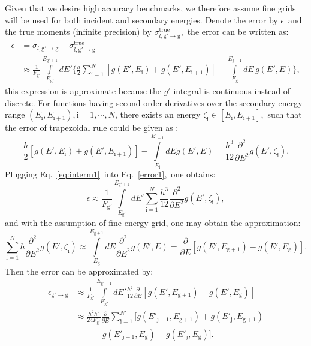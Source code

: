\documentclass[review]{elsarticle}
\newcommand{\fgp}{F_\mathrm{g'}}
\newcommand{\sgg}{\sigma_{l,\mathrm{g'}\to \mathrm{g}}}
\newcommand{\eg}{E_\mathrm{g}}
\newcommand{\egp}{E_\mathrm{g'}}
\newcommand{\ego}{E_\mathrm{g+1}}
\newcommand{\egpo}{E_\mathrm{g'+1}}
\begin{document}
Given that we desire high accuracy benchmarks, we therefore assume fine grids will be used for both incident and secondary energies. Denote the error by $\epsilon$~and the true moments (infinite precision) by $\sigma^{\mathrm{true}}_{l,\mathrm{g'}\to \mathrm{g}}$,~the error can be written as:
\begin{align}\label{error1}
\epsilon&=\sgg-\sigma^{\mathrm{true}}_{l,\mathrm{g'}\to \mathrm{g}}\nonumber\\
&\approx\frac{1}{\fgp}\int\limits_{\egp}^{\egpo}dE'\Bigg\{\frac{h}{2}\sum\limits_{\mathrm{i=}1}^N\left[g(E',E_\mathrm{i})+g(E',E_\mathrm{i+1})\right]-\int\limits_{\eg}^{\ego}dE\,g(E',E)\Bigg\},%
\end{align}
this expression is approximate because the $g'$ integral is continuous instead of discrete.
For functions having second-order derivatives over the secondary energy range $(E_\mathrm{i},E_\mathrm{i+1}),\mathrm{i}=1,\cdots,N$, there exists an energy $\zeta_\mathrm{i}\in[E_\mathrm{i},E_\mathrm{i+1}]$,~such that the error of trapezoidal rule could be given as \cite{numana1}:
\begin{equation}\label{eq:interm1}
\frac{h}{2}\left[g(E',E_\mathrm{i})+g(E',E_\mathrm{i+1})\right]-\int\limits_{E_\mathrm{i}}^{E_\mathrm{i+1}}dEg(E',E)=\frac{h^3}{12}\frac{\partial^2}{\partial E^2}g(E',\zeta_\mathrm{i}).
\end{equation}
Plugging Eq.~\eqref{eq:interm1}~into Eq.~\eqref{error1},~one obtains:
\begin{equation}
\epsilon\approx\frac{1}{\fgp}\int\limits_{\egp}^{\egpo}dE'\sum\limits_{\mathrm{i=}1}^{N}\frac{h^3}{12}\frac{\partial^2}{\partial E^2}g(E',\zeta_\mathrm{i}),
\end{equation}
and with the assumption of fine energy grid, one may obtain the approximation:
\begin{equation}
\sum\limits_{\mathrm{i=1}}^{N}h\frac{\partial^2}{\partial E^2}g(E',\zeta_\mathrm{i})\approx\int\limits_{E_\mathrm{g}}^{E_\mathrm{g+1}}dE\frac{\partial^2}{\partial E^2}g(E',E)=\frac{\partial}{\partial E}\left[g(E',\ego)-g(E',\eg)\right].
\end{equation}
Then the error can be approximated by:
\begin{align}\label{errorfinal}
\epsilon_{\mathrm{g'}\to\mathrm{g}}&\approx\frac{1}{\fgp}\int\limits_{\egp}^{\egpo}dE'\frac{h^2}{12}\frac{\partial}{\partial E}\left[g(E',\ego)-g(E',\eg)\right]\nonumber\\
&\approx\frac{h^2h'}{24\fgp}\frac{\partial}{\partial E}\sum\limits_{\mathrm{j=}1}^{N'}\bigg[g(E'_\mathrm{j+1},\ego)+g(E'_\mathrm{j},\ego)\\
& \qquad -g(E'_\mathrm{j+1},\eg)-g(E'_\mathrm{j},\eg)\bigg]\nonumber.
\end{align}
\end{document}
